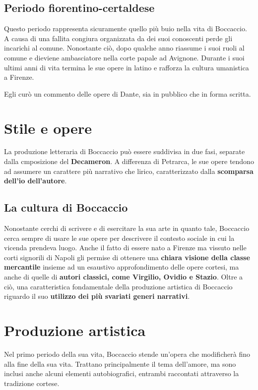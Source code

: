 \documentclass[10pt,a4paper]{article}
\begin{document}
	 \subsection{Periodo fiorentino-certaldese}

	 Questo periodo rappresenta sicuramente quello più buio nella vita di Boccaccio. A causa di una fallita congiura organizzata da dei suoi conoscenti perde gli incarichi al comune. Nonostante ciò, dopo qualche anno riassume i suoi ruoli al comune e dieviene ambasciatore nella corte papale ad Avignone. Durante i suoi ultimi anni di vita termina le sue opere in latino e rafforza la cultura umanistica a Firenze.

	 Egli curò un commento delle opere di Dante, sia in pubblico che in forma scritta.

	 \section{Stile e opere}

	 La produzione letteraria di Boccaccio può essere suddivisa in due fasi, separate dalla cmposizione del \textbf{Decameron}. A differenza di Petrarca, le sue opere tendono ad assumere un carattere più narrativo che lirico, caratterizzato dalla \textbf{scomparsa dell'io dell'autore}.

	 \subsection{La cultura di Boccaccio}

	 Nonostante cerchi di scrivere e di esercitare la sua arte in quanto tale, Boccaccio cerca sempre di usare le sue opere per descrivere il contesto sociale in cui la vicenda prendeva luogo. Anche il fatto di essere nato a Firenze ma vissuto nelle corti signorili di Napoli gli permise di ottenere una \textbf{chiara visione della classe mercantile} insieme ad un esaustivo approfondimento delle opere cortesi, ma anche di quelle di \textbf{autori classici, come Virgilio, Ovidio e Stazio}. Oltre a ciò, una caratteristica fondamentale della produzione artistica di Boccaccio riguardo il suo \textbf{utilizzo dei più svariati generi narrativi}.

	 \section{Produzione artistica}

	 Nel primo periodo della sua vita, Boccaccio stende un'opera che modificherà fino alla fine della sua vita. Trattano principalmente il tema dell'amore, ma sono inclusi anche alcuni elementi autobiografici, entrambi raccontati attraverso la tradizione cortese.
\end{document}
